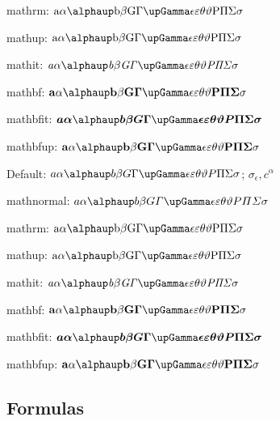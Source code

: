 \documentclass[12pt, a4paper, oneside]{article}
\newcommand{\mathup}[1]{\mathrm{#1}}
\newcommand{\mathbfit}[1]{\bm{#1}}
\newcommand{\mathbfup}[1]{\mathbf{#1}}
\theoremstyle{Plain}
\theoremstyle{Definition}
\theoremstyle{Remark}
\begin{document}
\begin{appendix}
{{mathrm: $\mathrm{a \alpha \alphaup b \beta G \Gamma \upGamma \epsilon \varepsilon \theta \vartheta P \Pi \Sigma \sigma}$

mathup: $\mathup{a \alpha \alphaup b \beta G \Gamma \upGamma \epsilon \varepsilon \theta \vartheta P \Pi \Sigma \sigma}$

mathit: $\mathit{a \alpha \alphaup b \beta G \Gamma \upGamma \epsilon \varepsilon \theta \vartheta P \Pi \Sigma \sigma}$

mathbf: $\mathbf{a \alpha \alphaup b \beta G \Gamma \upGamma \epsilon \varepsilon \theta \vartheta P \Pi \Sigma \sigma}$

mathbfit: $\mathbfit{a \alpha \alphaup b \beta G \Gamma \upGamma \epsilon \varepsilon \theta \vartheta P \Pi \Sigma \sigma}$

mathbfup: $\mathbfup{a \alpha \alphaup b \beta G \Gamma \upGamma \epsilon \varepsilon \theta \vartheta P \Pi \Sigma \sigma}$
}

\bigskip

{\sffamily\bfseries

Default: $a \alpha \alphaup b \beta G \Gamma \upGamma \epsilon \varepsilon \theta \vartheta P \Pi \Sigma \sigma$; $\sigma_\epsilon, c^\alpha$

mathnormal: $\mathnormal{a \alpha \alphaup b \beta G \Gamma \upGamma \epsilon \varepsilon \theta \vartheta P \Pi \Sigma \sigma}$

mathrm: $\mathrm{a \alpha \alphaup b \beta G \Gamma \upGamma \epsilon \varepsilon \theta \vartheta P \Pi \Sigma \sigma}$

mathup: $\mathup{a \alpha \alphaup b \beta G \Gamma \upGamma \epsilon \varepsilon \theta \vartheta P \Pi \Sigma \sigma}$

mathit: $\mathit{a \alpha \alphaup b \beta G \Gamma \upGamma \epsilon \varepsilon \theta \vartheta P \Pi \Sigma \sigma}$

mathbf: $\mathbf{a \alpha \alphaup b \beta G \Gamma \upGamma \epsilon \varepsilon \theta \vartheta P \Pi \Sigma \sigma}$

mathbfit: $\mathbfit{a \alpha \alphaup b \beta G \Gamma \upGamma \epsilon \varepsilon \theta \vartheta P \Pi \Sigma \sigma}$

mathbfup: $\mathbfup{a \alpha \alphaup b \beta G \Gamma \upGamma \epsilon \varepsilon \theta \vartheta P \Pi \Sigma \sigma}$
}
}

\subsection{Formulas \showfamily}


\end{appendix}
\end{document}
